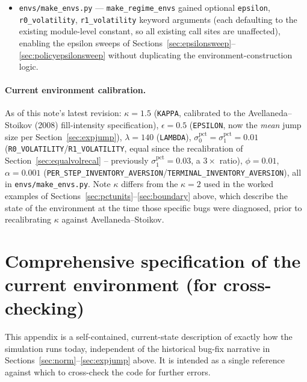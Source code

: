 \documentclass[11pt]{article}
\begin{document}
\begin{itemize}
\item \texttt{envs/make\_envs.py} --- \texttt{make\_regime\_envs} gained optional \texttt{epsilon}, \texttt{r0\_volatility}, \texttt{r1\_volatility} keyword arguments (each defaulting to the existing module-level constant, so all existing call sites are unaffected), enabling the epsilon sweeps of Sections~\ref{sec:epsilonsweep}--\ref{sec:policyepsilonsweep} without duplicating the environment-construction logic.
\end{itemize}

\paragraph{Current environment calibration.} As of this note's latest revision: $\kappa=1.5$ (\texttt{KAPPA}, calibrated to the Avellaneda--Stoikov (2008) fill-intensity specification), $\epsilon=0.5$ (\texttt{EPSILON}, now the \emph{mean} jump size per Section~\ref{sec:expjump}), $\lambda=140$ (\texttt{LAMBDA}), $\sigma_0^{\text{pct}}=\sigma_1^{\text{pct}}=0.01$ (\texttt{R0\_VOLATILITY}/\texttt{R1\_VOLATILITY}, equal since the recalibration of Section~\ref{sec:equalvolrecal} -- previously $\sigma_1^{\text{pct}}=0.03$, a $3\times$ ratio), $\phi=0.01$, $\alpha=0.001$ (\texttt{PER\_STEP\_INVENTORY\_AVERSION}/\texttt{TERMINAL\_INVENTORY\_AVERSION}), all in \texttt{envs/make\_envs.py}. Note $\kappa$ differs from the $\kappa=2$ used in the worked examples of Sections~\ref{sec:pctunits}--\ref{sec:boundary} above, which describe the state of the environment at the time those specific bugs were diagnosed, prior to recalibrating $\kappa$ against Avellaneda--Stoikov.

\appendix

\section{Comprehensive specification of the current environment (for cross-checking)}
\label{sec:currentstate}

This appendix is a self-contained, current-state description of exactly how the simulation runs today, independent of the historical bug-fix narrative in Sections~\ref{sec:norm}--\ref{sec:expjump} above. It is intended as a single reference against which to cross-check the code for further errors.
\end{document}

